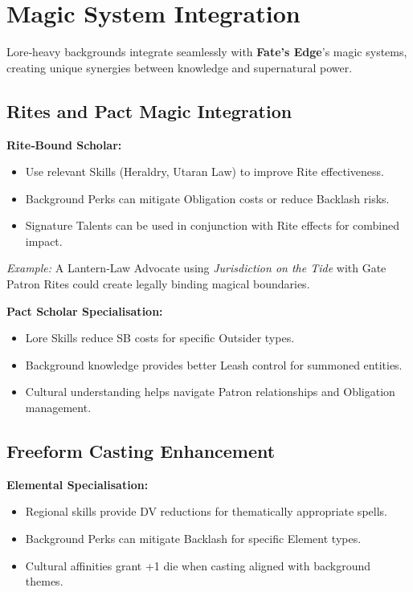 \section{Magic System Integration}\label{sec:magic_integration}

Lore‑heavy backgrounds integrate seamlessly with \textbf{Fate's Edge}'s magic systems, creating unique synergies between knowledge and supernatural power.

\subsection{Rites and Pact Magic Integration}\label{subsec:rites_integration}

\textbf{Rite‑Bound Scholar:}
\begin{itemize}
    \item Use relevant Skills (Heraldry, Utaran Law) to improve Rite effectiveness.
    \item Background Perks can mitigate Obligation costs or reduce Backlash risks.
    \item Signature Talents can be used in conjunction with Rite effects for combined impact.
\end{itemize}
\textit{Example:} A Lantern‑Law Advocate using \emph{Jurisdiction on the Tide} with Gate Patron Rites could create legally binding magical boundaries.

\textbf{Pact Scholar Specialisation:}
\begin{itemize}
    \item Lore Skills reduce SB costs for specific Outsider types.
    \item Background knowledge provides better Leash control for summoned entities.
    \item Cultural understanding helps navigate Patron relationships and Obligation management.
\end{itemize}

\subsection{Freeform Casting Enhancement}\label{subsec:casting_enhancement}

\textbf{Elemental Specialisation:}
\begin{itemize}
    \item Regional skills provide DV reductions for thematically appropriate spells.
    \item Background Perks can mitigate Backlash for specific Element types.
    \item Cultural affinities grant +1 die when casting aligned with background themes.
\end{itemize}

